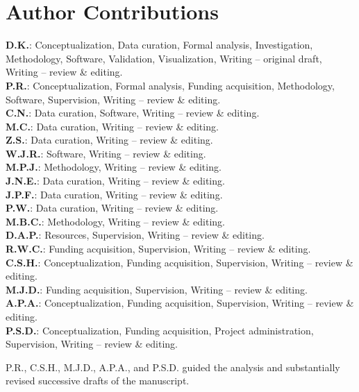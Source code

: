 
\section*{Author Contributions}

\begin{flushleft}
\textbf{D.K.}: Conceptualization, Data curation, Formal analysis, Investigation, Methodology, Software, Validation, Visualization, Writing -- original draft, Writing -- review \& editing.\\
\textbf{P.R.}: Conceptualization, Formal analysis, Funding acquisition, Methodology, Software, Supervision, Writing -- review \& editing.\\
\textbf{C.N.}: Data curation, Software, Writing -- review \& editing.\\
\textbf{M.C.}: Data curation, Writing -- review \& editing.\\
\textbf{Z.S.}: Data curation, Writing -- review \& editing.\\
\textbf{W.J.R.}: Software, Writing -- review \& editing.\\
\textbf{M.P.J.}: Methodology, Writing -- review \& editing.\\
\textbf{J.N.E.}: Data curation, Writing -- review \& editing.\\
\textbf{J.P.F.}: Data curation, Writing -- review \& editing.\\
\textbf{P.W.}: Data curation, Writing -- review \& editing.\\
\textbf{M.B.C.}: Methodology, Writing -- review \& editing.\\
\textbf{D.A.P.}: Resources, Supervision, Writing -- review \& editing.\\
\textbf{R.W.C.}: Funding acquisition, Supervision, Writing -- review \& editing.\\
\textbf{C.S.H.}: Conceptualization, Funding acquisition, Supervision, Writing -- review \& editing.\\
\textbf{M.J.D.}: Funding acquisition, Supervision, Writing -- review \& editing.\\
\textbf{A.P.A.}: Conceptualization, Funding acquisition, Supervision, Writing -- review \& editing.\\
\textbf{P.S.D.}: Conceptualization, Funding acquisition, Project administration, Supervision, Writing -- review \& editing.
\end{flushleft}

P.R., C.S.H., M.J.D., A.P.A., and P.S.D. guided the analysis and substantially revised successive drafts of the manuscript.
